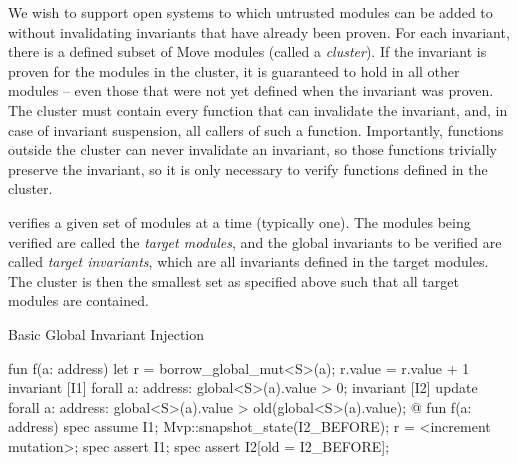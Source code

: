
We wish to support open systems to which untrusted modules can be added to
without invalidating invariants that have already been proven. For each
invariant, there is a defined subset of Move modules (called a
\textit{cluster}). If the invariant is proven for the modules in the cluster, it
is guaranteed to hold in all other modules -- even those that were not yet
defined when the invariant was proven.  The cluster must contain every function
that can invalidate the invariant, and, in case of invariant suspension, all
callers of such a function.  Importantly, functions outside the cluster can
never invalidate an invariant, so those functions trivially preserve the
invariant, so it is only necessary to verify functions defined in the cluster.

\MVP verifies a given set of modules at a time (typically one).  The modules
being verified are called the \textit{target modules}, and the global invariants
to be verified are called \textit{target invariants}, which are all invariants
defined in the target modules. The cluster is then the smallest set as specified
above such that all target modules are contained.


\begin{Figure}
  \caption{Basic Global Invariant Injection}
  \label{fig:GlobalInvariants}
  \centering
\begin{MoveBox}
  fun f(a: address) {
    let r = borrow_global_mut<S>(a);
    r.value = r.value + 1
  }
  invariant [I1] forall a: address: global<S>(a).value > 0;
  invariant [I2] update forall a: address:
      global<S>(a).value > old(global<S>(a).value);
  @\transform@
  fun f(a: address) {
    spec assume I1;
    Mvp::snapshot_state(I2_BEFORE);
    r = <increment mutation>;
    spec assert I1;
    spec assert I2[old = I2_BEFORE];
  }
\end{MoveBox}
\end{Figure}



